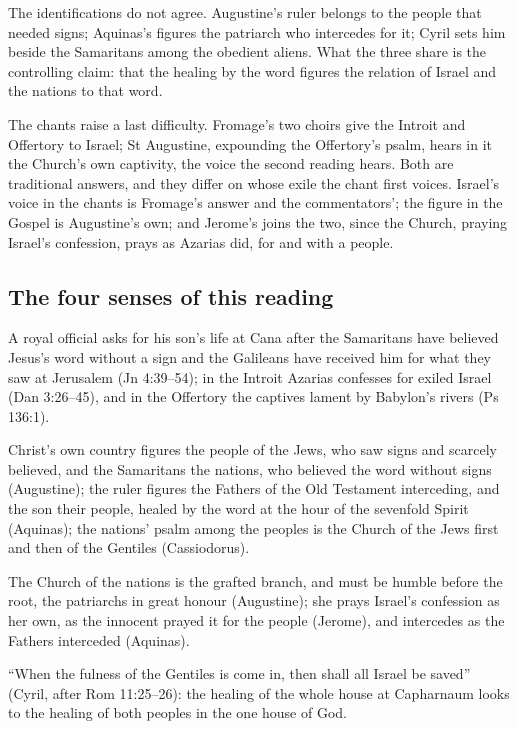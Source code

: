 The identifications do not agree.
Augustine's ruler belongs to the people that needed signs; Aquinas's figures
the patriarch who intercedes for it; Cyril sets him beside the Samaritans among
the obedient aliens. What the three share is the controlling claim: that the
healing by the word figures the relation of Israel and the nations to that
word.

The chants raise a last difficulty. Fromage's two choirs give the Introit and
Offertory to Israel; St Augustine, expounding the Offertory's psalm, hears in it
the Church's own captivity, the voice the second reading hears. Both are
traditional answers, and they differ on whose exile the chant first voices. Israel's
voice in the chants is Fromage's answer and the commentators'; the figure in the
Gospel is Augustine's own; and Jerome's  joins the two, since the Church, praying Israel's confession, prays as Azarias did,
for and with a people.

\subsection{The four senses of this reading}

\begin{fourSenses}
\item[Literal.] A royal official asks for his son's life at Cana after the
Samaritans have believed Jesus's word without a sign and the Galileans have
received him for what they saw at Jerusalem (Jn 4:39--54); in the Introit
Azarias confesses for exiled Israel (Dan 3:26--45), and in the Offertory the
captives lament by Babylon's rivers (Ps 136:1).

\item[Allegorical.] Christ's own country figures the people of the Jews, who saw
signs and scarcely believed, and the Samaritans the nations, who believed the
word without signs (Augustine); the ruler figures the Fathers of the Old
Testament interceding, and the son their people, healed by the word at the hour
of the sevenfold Spirit (Aquinas); the nations' psalm among the peoples is the
Church of the Jews first and then of the Gentiles (Cassiodorus).

\item[Moral.] The Church of the nations is the grafted branch, and must be humble
before the root, the patriarchs in great honour (Augustine); she prays Israel's
confession as her own, as the innocent prayed it for the people (Jerome), and
intercedes as the Fathers interceded (Aquinas).

\item[Anagogical.] ``When the fulness of the Gentiles is come in, then shall all
Israel be saved'' (Cyril, after Rom 11:25--26): the healing of the whole house
at Capharnaum looks to the healing of both peoples in the one house of God.
\end{fourSenses}
